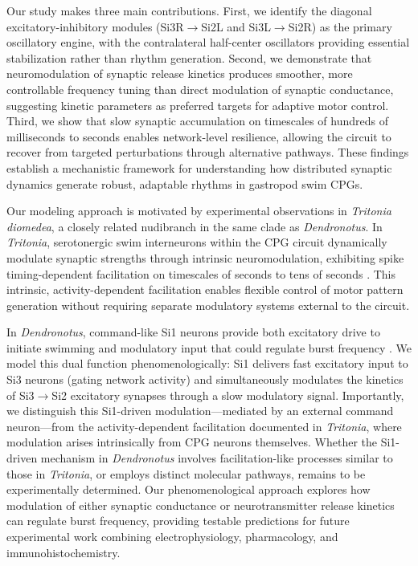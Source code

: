 \documentclass[nofootinbib,aip,amsmath,amssymb,preprint,twocolumn,floatfix,10pt]{revtex4-2}
\begin{document}
Our study makes three main contributions. First, we identify the diagonal excitatory-inhibitory modules (Si3R$\to$Si2L and Si3L$\to$Si2R) as the primary oscillatory engine, with the contralateral half-center oscillators providing essential stabilization rather than rhythm generation. Second, we demonstrate that neuromodulation of synaptic release kinetics produces smoother, more controllable frequency tuning than direct modulation of synaptic conductance, suggesting kinetic parameters as preferred targets for adaptive motor control. Third, we show that slow synaptic accumulation on timescales of hundreds of milliseconds to seconds enables network-level resilience, allowing the circuit to recover from targeted perturbations through alternative pathways. These findings establish a mechanistic framework for understanding how distributed synaptic dynamics generate robust, adaptable rhythms in gastropod swim CPGs.

Our modeling approach is motivated by experimental observations in \textit{Tritonia diomedea}, a closely related nudibranch in the same clade as \textit{Dendronotus}. In \textit{Tritonia}, serotonergic swim interneurons within the CPG circuit dynamically modulate synaptic strengths through intrinsic neuromodulation, exhibiting spike timing-dependent facilitation on timescales of seconds to tens of seconds \cite{katz1994dynamic, sakurai2003spike}. This intrinsic, activity-dependent facilitation enables flexible control of motor pattern generation without requiring separate modulatory systems external to the circuit.

In \textit{Dendronotus}, command-like Si1 neurons provide both excitatory drive to initiate swimming and modulatory input that could regulate burst frequency \cite{sakurai2019command}. We model this dual function phenomenologically: Si1 delivers fast excitatory input to Si3 neurons (gating network activity) and simultaneously modulates the kinetics of Si3$\to$Si2 excitatory synapses through a slow modulatory signal. Importantly, we distinguish this Si1-driven modulation---mediated by an external command neuron---from the activity-dependent facilitation documented in \textit{Tritonia}, where modulation arises intrinsically from CPG neurons themselves. Whether the Si1-driven mechanism in \textit{Dendronotus} involves facilitation-like processes similar to those in \textit{Tritonia}, or employs distinct molecular pathways, remains to be experimentally determined. Our phenomenological approach explores how modulation of either synaptic conductance or neurotransmitter release kinetics can regulate burst frequency, providing testable predictions for future experimental work combining electrophysiology, pharmacology, and immunohistochemistry.
\end{document}
